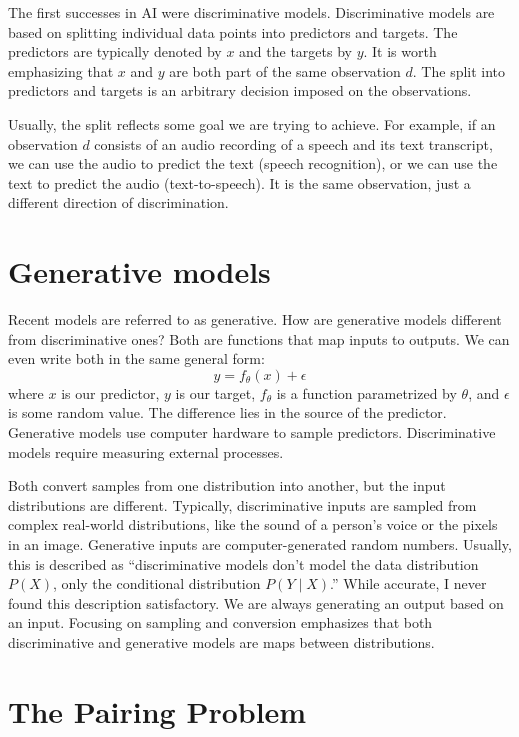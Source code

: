 \documentclass[11pt]{article}
\begin{document}
The first successes in AI were discriminative models. Discriminative models are based on splitting individual data points into predictors and targets. The predictors are typically denoted by $x$ and the targets by $y$. It is worth emphasizing that $x$ and $y$ are both part of the same observation $d$. The split into predictors and targets is an arbitrary decision imposed on the observations.

Usually, the split reflects some goal we are trying to achieve. For example, if an observation $d$ consists of an audio recording of a speech and its text transcript, we can use the audio to predict the text (speech recognition), or we can use the text to predict the audio (text-to-speech). It is the same observation, just a different direction of discrimination.

\section*{Generative models}

Recent models are referred to as generative. How are generative models different from discriminative ones? Both are functions that map inputs to outputs. We can even write both in the same general form:
\begin{equation*}
    y = f_{\theta}(x) + \epsilon
\end{equation*}
where $x$ is our predictor, $y$ is our target, $f_{\theta}$ is a function parametrized by $\theta$, and $\epsilon$ is some random value. The difference lies in the source of the predictor. Generative models use computer hardware to sample predictors. Discriminative models require measuring external processes.

Both convert samples from one distribution into another, but the input distributions are different. Typically, discriminative inputs are sampled from complex real-world distributions, like the sound of a person's voice or the pixels in an image. Generative inputs are computer-generated random numbers. Usually, this is described as ``discriminative models don't model the data distribution $P(X)$, only the conditional distribution $P(Y \mid X)$.'' While accurate, I never found this description satisfactory. We are always generating an output based on an input. Focusing on sampling and conversion emphasizes that both discriminative and generative models are maps between distributions.

\section*{The Pairing Problem}
\end{document}
